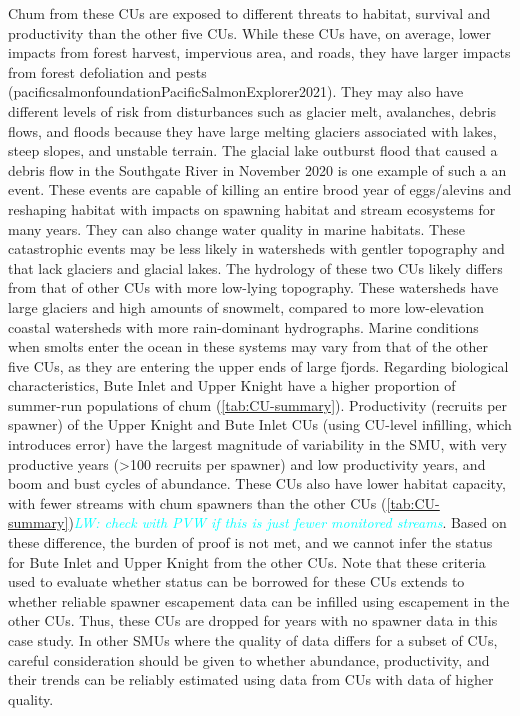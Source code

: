 \documentclass[11pt]{book}
\begin{document}
Chum from these CUs are exposed to different threats to habitat, survival and productivity than the other five CUs. While these CUs have, on average, lower impacts from forest harvest, impervious area, and roads, they have larger impacts from forest defoliation and pests (pacificsalmonfoundationPacificSalmonExplorer2021). They may also have different levels of risk from disturbances such as glacier melt, avalanches, debris flows, and floods because they have large melting glaciers associated with lakes, steep slopes, and unstable terrain. The glacial lake outburst flood that caused a debris flow in the Southgate River in November 2020 is one example of such a an event. These events are capable of killing an entire brood year of eggs/alevins and reshaping habitat with impacts on spawning habitat and stream ecosystems for many years. They can also change water quality in marine habitats. These catastrophic events may be less likely in watersheds with gentler topography and that lack glaciers and glacial lakes. The hydrology of these two CUs likely differs from that of other CUs with more low-lying topography. These watersheds have large glaciers and high amounts of snowmelt, compared to more low-elevation coastal watersheds with more rain-dominant hydrographs. Marine conditions when smolts enter the ocean in these systems may vary from that of the other five CUs, as they are entering the upper ends of large fjords. Regarding biological characteristics, Bute Inlet and Upper Knight have a higher proportion of summer-run populations of chum (\ref{tab:CU-summary}). Productivity (recruits per spawner) of the Upper Knight and Bute Inlet CUs (using CU-level infilling, which introduces error) have the largest magnitude of variability in the SMU, with very productive years (\textgreater100 recruits per spawner) and low productivity years, and boom and bust cycles of abundance. These CUs also have lower habitat capacity, with fewer streams with chum spawners than the other CUs (\ref{tab:CU-summary})\emph{\textcolor{cyan}{LW: check with PVW if this is just fewer monitored streams}}. Based on these difference, the burden of proof is not met, and we cannot infer the status for Bute Inlet and Upper Knight from the other CUs. Note that these criteria used to evaluate whether status can be borrowed for these CUs extends to whether reliable spawner escapement data can be infilled using escapement in the other CUs. Thus, these CUs are dropped for years with no spawner data in this case study. In other SMUs where the quality of data differs for a subset of CUs, careful consideration should be given to whether abundance, productivity, and their trends can be reliably estimated using data from CUs with data of higher quality.
\end{document}
